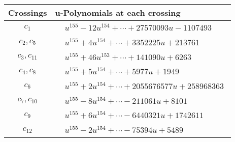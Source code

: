 \documentclass[1p]{elsarticle_modified}
\theoremstyle{definition}
\begin{document}
\begin{tabular}{m{50pt}|m{274pt}}
Crossings & \hspace{64pt}u-Polynomials at each crossing \\
\hline $$\begin{aligned}c_{1}\end{aligned}$$&$\begin{aligned}
&u^{155}-12 u^{154}+\cdots+27570093 u-1107493
\end{aligned}$\\
\hline $$\begin{aligned}c_{2},c_{5}\end{aligned}$$&$\begin{aligned}
&u^{155}+4 u^{154}+\cdots+3352225 u+213761
\end{aligned}$\\
\hline $$\begin{aligned}c_{3},c_{11}\end{aligned}$$&$\begin{aligned}
&u^{155}+46 u^{153}+\cdots+141090 u+6263
\end{aligned}$\\
\hline $$\begin{aligned}c_{4},c_{8}\end{aligned}$$&$\begin{aligned}
&u^{155}+5 u^{154}+\cdots+5977 u+1949
\end{aligned}$\\
\hline $$\begin{aligned}c_{6}\end{aligned}$$&$\begin{aligned}
&u^{155}+2 u^{154}+\cdots+2055676577 u+258968363
\end{aligned}$\\
\hline $$\begin{aligned}c_{7},c_{10}\end{aligned}$$&$\begin{aligned}
&u^{155}-8 u^{154}+\cdots-211061 u+8101
\end{aligned}$\\
\hline $$\begin{aligned}c_{9}\end{aligned}$$&$\begin{aligned}
&u^{155}+6 u^{154}+\cdots-6440321 u+1742611
\end{aligned}$\\
\hline $$\begin{aligned}c_{12}\end{aligned}$$&$\begin{aligned}
&u^{155}-2 u^{154}+\cdots-75394 u+5489
\end{aligned}$\\
\hline
\end{tabular}\\~\\
\end{document}
